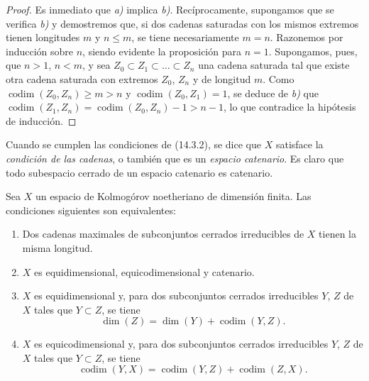 \begin{proof}
Es inmediato que \emph{a)} implica \emph{b)}. Recíprocamente, supongamos que se verifica \emph{b)} y
demostremos que, si dos cadenas saturadas con los mismos extremos tienen
longitudes $m$ y $n\leq m$, se tiene necesariamente $m=n$. Razonemos por
inducción sobre $n$, siendo evidente la proposición para $n=1$. Supongamos,
pues, que $n>1$, $n<m$, y sea $Z_0\subset Z_1\subset\ldots\subset Z_n$ una
cadena saturada tal que existe otra cadena saturada con extremos
$Z_0$, $Z_n$ y de longitud $m$. Como
$\operatorname{codim}(Z_0,Z_n)\geq m>n$ y
$\operatorname{codim}(Z_0,Z_1)=1$, se deduce de \emph{b)} que
$\operatorname{codim}(Z_1,Z_n)=\operatorname{codim}(Z_0,Z_n)-1>n-1$, lo que
contradice la hipótesis de inducción.
\end{proof}

Cuando se cumplen las condiciones de (14.3.2), se dice que $X$ satisface la
\emph{condición de las cadenas}, o también que es un \emph{espacio catenario}.
Es claro que todo subespacio cerrado de un espacio catenario es catenario.

\begin{proposition}[14.3.3]
\label{0.14.3.3-fr}
Sea $X$ un espacio de Kolmogórov noetheriano de dimensión finita. Las
condiciones siguientes son equivalentes:
\begin{enumerate}
  \item[\rm(a)] Dos cadenas maximales de subconjuntos cerrados irreducibles de
  $X$ tienen la misma longitud.
  \item[\rm(b)] $X$ es equidimensional, equicodimensional y catenario.
  \item[\textup{c)}] $X$ es equidimensional y, para dos subconjuntos cerrados
  irreducibles $Y$, $Z$ de $X$ tales que $Y\subset Z$, se tiene
  \[
    \dim(Z)=\dim(Y)+\operatorname{codim}(Y,Z).
    \tag{14.3.3.1}\label{0.14.3.3.1-fr}
  \]
  \item[\textup{d)}] $X$ es equicodimensional y, para dos subconjuntos cerrados
  irreducibles $Y$, $Z$ de $X$ tales que $Y\subset Z$, se tiene
  \[
    \operatorname{codim}(Y,X)=
    \operatorname{codim}(Y,Z)+\operatorname{codim}(Z,X).
    \tag{14.3.3.2}\label{0.14.3.3.2-fr}
  \]
\end{enumerate}
\end{proposition}

